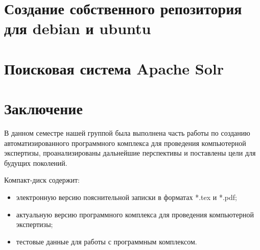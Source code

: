 \section{Создание собственного репозитория для debian и ubuntu}
\setcounter{figure}{0}


\section{Поисковая система Apache Solr}
\setcounter{figure}{0}



\setcounter{figure}{0}


\setcounter{figure}{0}


\newpage
\section*{Заключение}
В данном семестре нашей группой была выполнена часть работы по созданию автоматизированного программного комплекса для проведения компьютерной экспертизы, проанализированы дальнейшие перспективы и поставлены цели для будущих поколений.

\newpage
\renewcommand{\refname}{Список использованных источников}


Компакт-диск содержит: 
\begin{itemize}
\item электронную версию пояснительной записки в форматах *.tex и *.pdf;
\item актуальную версию программного комплекса для проведения компьютерной экспертизы;
\item тестовые данные для работы с программным комплексом.
\end{itemize}


